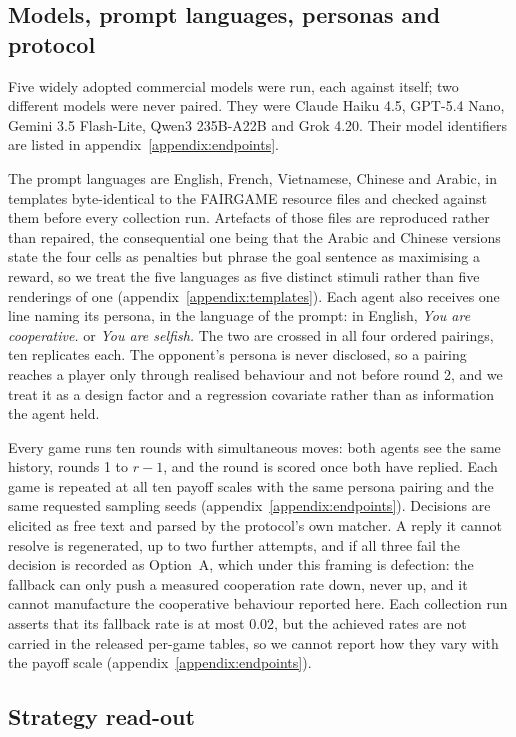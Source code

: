 \documentclass[11pt,a4paper]{article}
\begin{document}
\subsection{Models, prompt languages, personas and protocol}\label{sec:protocol}

Five widely adopted commercial models were run, each against itself; two different models were
never paired. They were Claude Haiku 4.5, GPT-5.4 Nano, Gemini 3.5 Flash-Lite,
Qwen3 235B-A22B and Grok 4.20. Their model identifiers are listed in
appendix~\ref{appendix:endpoints}.

The prompt languages are English, French, Vietnamese, Chinese and Arabic, in
templates byte-identical to the FAIRGAME resource files and checked against
them before every collection run. Artefacts of those files are reproduced
rather than repaired, the consequential one being that the Arabic and Chinese
versions state the four cells as penalties but phrase the goal sentence as
maximising a reward, so we treat the five languages as five distinct stimuli
rather than five renderings of one (appendix~\ref{appendix:templates}). Each
agent also receives one line naming its persona, in the language of the prompt:
in English, \emph{You are cooperative.} or \emph{You are selfish.} The two are
crossed in all four ordered pairings, ten replicates each. The opponent's
persona is never disclosed, so a pairing reaches a player only through realised
behaviour and not before round 2, and we treat it as a design factor and a
regression covariate rather than as information the agent held.

Every game runs ten rounds with simultaneous moves: both agents see the same
history, rounds 1 to $r-1$, and the round is scored once both have replied.
Each game is repeated at all ten payoff scales with the same persona pairing
and the same requested sampling seeds (appendix~\ref{appendix:endpoints}). Decisions are elicited as free text and parsed by the protocol's own matcher. A reply it cannot
resolve is regenerated, up to two further attempts, and if all three fail the
decision is recorded as Option~A, which under this framing is defection: the
fallback can only push a measured cooperation rate down, never up, and it
cannot manufacture the cooperative behaviour reported here. Each collection run
asserts that its fallback rate is at most 0.02, but the achieved rates are not
carried in the released per-game tables, so we cannot report how they vary with
the payoff scale (appendix~\ref{appendix:endpoints}).

\subsection{Strategy read-out}\label{sec:readout}
\end{document}
